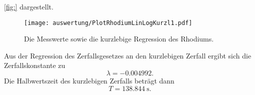   \ref{fig:} dargestellt.
  \begin{figure}[H]
    \centering
    \caption{Die Messwerte sowie die kurzlebige Regression des Rhodiums.}
    \label{fig:PlotRhodiumLinLogKurzl1}
    \texttt{[image: auswertung/PlotRhodiumLinLogKurzl1.pdf]}
  \end{figure}
  \noindent
  Aus der Regression des Zerfallsgesetzes an den kurzlebigen Zerfall ergibt sich die Zerfallskonstante zu
  \begin{equation}
    \label{eqn:zerfallskonstanterhodiumergebnisskurzlebig}
    \lambda =   -0.004992.
  \end{equation}
  Die Halbwertszeit des kurzlebigen Zerfalls beträgt dann
  \begin{equation}
    \label{eqn:halbwertszeitrhodiumergebnisskurzlebig}
    T = \SI{138.844}{\second}.
  \end{equation}
